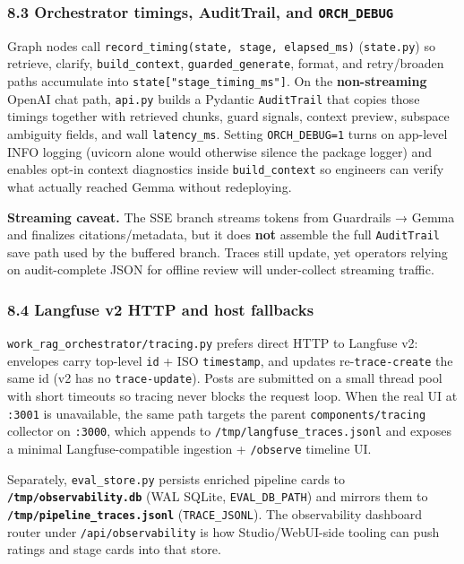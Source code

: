 \documentclass[
  11pt,
]{article}
\begin{document}
\subsubsection{\texorpdfstring{8.3 Orchestrator timings, AuditTrail, and
\texttt{ORCH\_DEBUG}}{8.3 Orchestrator timings, AuditTrail, and ORCH\_DEBUG}}\label{orchestrator-timings-audittrail-and-orch_debug}

Graph nodes call \texttt{record\_timing(state,\ stage,\ elapsed\_ms)}
(\texttt{state.py}) so retrieve, clarify, \texttt{build\_context},
\texttt{guarded\_generate}, format, and retry/broaden paths accumulate
into \texttt{state{[}"stage\_timing\_ms"{]}}. On the
\textbf{non-streaming} OpenAI chat path, \texttt{api.py} builds a
Pydantic \texttt{AuditTrail} that copies those timings together with
retrieved chunks, guard signals, context preview, subspace ambiguity
fields, and wall \texttt{latency\_ms}. Setting \texttt{ORCH\_DEBUG=1}
turns on app-level INFO logging (uvicorn alone would otherwise silence
the package logger) and enables opt-in context diagnostics inside
\texttt{build\_context} so engineers can verify what actually reached
Gemma without redeploying.

\textbf{Streaming caveat.} The SSE branch streams tokens from Guardrails
→ Gemma and finalizes citations/metadata, but it does \textbf{not}
assemble the full \texttt{AuditTrail} save path used by the buffered
branch. Traces still update, yet operators relying on audit-complete
JSON for offline review will under-collect streaming traffic.

\subsubsection{8.4 Langfuse v2 HTTP and host
fallbacks}\label{langfuse-v2-http-and-host-fallbacks}

\texttt{work\_rag\_orchestrator/tracing.py} prefers direct HTTP to
Langfuse v2: envelopes carry top-level \texttt{id} + ISO
\texttt{timestamp}, and updates re-\texttt{trace-create} the same id (v2
has no \texttt{trace-update}). Posts are submitted on a small thread
pool with short timeouts so tracing never blocks the request loop. When
the real UI at \texttt{:3001} is unavailable, the same path targets the
parent \texttt{components/tracing} collector on \texttt{:3000}, which
appends to \texttt{/tmp/langfuse\_traces.jsonl} and exposes a minimal
Langfuse-compatible ingestion + \texttt{/observe} timeline UI.

Separately, \texttt{eval\_store.py} persists enriched pipeline cards to
\textbf{\texttt{/tmp/observability.db}} (WAL SQLite,
\texttt{EVAL\_DB\_PATH}) and mirrors them to
\textbf{\texttt{/tmp/pipeline\_traces.jsonl}} (\texttt{TRACE\_JSONL}).
The observability dashboard router under \texttt{/api/observability} is
how Studio/WebUI-side tooling can push ratings and stage cards into that
store.
\end{document}
